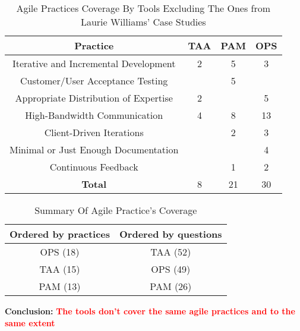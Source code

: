 \begin{table} [H]
\centering
	\footnotesize
	\begin{tabular}{| c | c | c | c |} \hline
		\textbf{Practice} & \textbf{TAA} & \textbf{PAM} & \textbf{OPS} \\ \hline
		Iterative and Incremental Development & 2 & 5 & 3 \\ \hline		
		Customer/User Acceptance Testing & & 5 & \\ \hline		
		Appropriate Distribution of Expertise & 2 & & 5 \\ \hline
		High-Bandwidth Communication & 4 & 8 & 13 \\ \hline					
		Client-Driven Iterations & & 2 & 3 \\ \hline
		Minimal or Just Enough Documentation & & & 4 \\ \hline
		Continuous Feedback & & 1 & 2 \\ \hline
		\textbf{Total} & 8 & 21 & 30 \\ \hline
	\end{tabular}
	\caption{{\footnotesize Agile Practices Coverage By Tools Excluding The Ones from Laurie Williams' Case Studies}}
\end{table}

\clearpage

\begin{table}
\centering
	\begin{tabular}{| c | c |} \hline
		\textbf{Ordered by practices} & \textbf{Ordered by questions} \\ \hline
		OPS (18) & TAA (52) \\ \hline
		TAA (15) & OPS (49) \\ \hline
		PAM (13) & PAM (26) \\ \hline
	\end{tabular}
	\caption{Summary Of Agile Practice's Coverage}
	\label{table:agile_practices_coverage_summary}
\end{table}

\textbf{Conclusion:} \textcolor{red}{\textbf{The tools don't cover the same agile practices and to the same extent}} \\

\clearpage